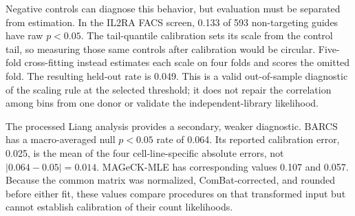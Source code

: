 Negative controls can diagnose this behavior, but evaluation must be separated
from estimation.  In the IL2RA FACS screen, 0.133 of 593 non-targeting guides
have raw $p<0.05$.  The tail-quantile calibration sets its scale from the
control tail, so measuring those same controls after calibration would be
circular.  Five-fold cross-fitting instead estimates each scale on four folds
and scores the omitted fold.  The resulting held-out rate is 0.049.  This is a
valid out-of-sample diagnostic of the scaling rule at the selected threshold;
it does not repair the correlation among bins from one donor or validate the
independent-library likelihood.

The processed Liang analysis provides a secondary, weaker diagnostic.  BARCS
has a macro-averaged null $p<0.05$ rate of 0.064.  Its reported calibration
error, 0.025, is the mean of the four cell-line-specific absolute errors, not
$|0.064-0.05|=0.014$.  MAGeCK-MLE has corresponding values 0.107 and 0.057.
Because the common matrix was normalized, ComBat-corrected, and rounded before
either fit, these values compare procedures on that transformed input but
cannot establish calibration of their count likelihoods.
